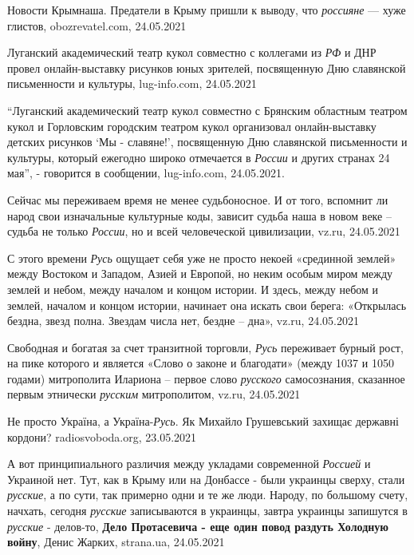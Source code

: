  
 
 
 
 

Новости Крымнаша. Предатели в Крыму пришли к выводу, что \emph{россияне} — хуже
глистов, obozrevatel.com, 24.05.2021

Луганский академический театр кукол совместно с коллегами из \emph{РФ} и ДНР
провел онлайн-выставку рисунков юных зрителей, посвященную Дню славянской
письменности и культуры, lug-info.com, 24.05.2021

\enquote{Луганский академический театр кукол совместно с Брянским областным
театром кукол и Горловским городским театром кукол организовал онлайн-выставку
детских рисунков \enquote{Мы - славяне!}, посвященную Дню славянской
письменности и культуры, который ежегодно широко отмечается в \emph{России} и
других странах 24 мая}, - говорится в сообщении, lug-info.com, 24.05.2021.

Сейчас мы переживаем время не менее судьбоносное. И от того, вспомнит ли народ
свои изначальные культурные коды, зависит судьба наша в новом веке – судьба не
только \emph{России}, но и всей человеческой цивилизации, vz.ru, 24.05.2021

С этого времени \emph{Русь} ощущает себя уже не просто некоей «срединной
землей» между Востоком и Западом, Азией и Европой, но неким особым миром между
землей и небом, между началом и концом истории. И здесь, между небом и землей,
началом и концом истории, начинает она искать свои берега: «Открылась бездна,
звезд полна. Звездам числа нет, бездне – дна», vz.ru, 24.05.2021

Свободная и богатая за счет транзитной торговли, \emph{Русь} переживает бурный
рост, на пике которого и является «Слово о законе и благодати» (между 1037 и
1050 годами) митрополита Илариона – первое слово \emph{русского} самосознания,
сказанное первым этнически \emph{русским} митрополитом, vz.ru, 24.05.2021

Не просто Україна, а Україна-\emph{Русь}. Як Михайло Грушевський захищає
державні кордони?  radiosvoboda.org, 23.05.2021

А вот принципиального различия между укладами современной \emph{Россией} и
Украиной нет. Тут, как в Крыму или на Донбассе - были украинцы сверху, стали
\emph{русские}, а по сути, так примерно одни и те же люди. Народу, по большому
счету, начхать, сегодня \emph{русские} записываются в украинцы, завтра украинцы
запишутся в \emph{русские} - делов-то, \textbf{Дело Протасевича - еще один
повод раздуть Холодную войну}, Денис Жарких, strana.ua, 24.05.2021

